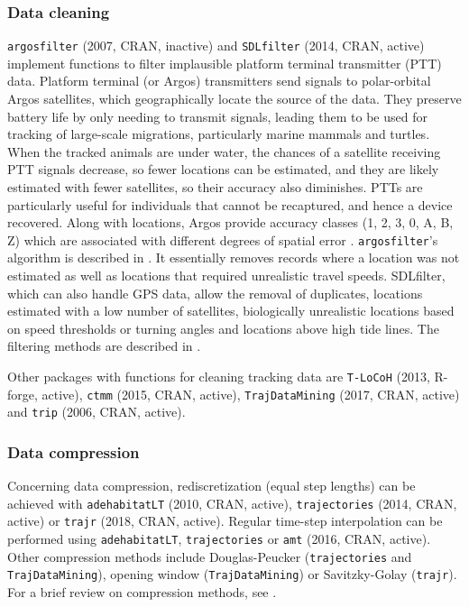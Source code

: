\documentclass[a4paper,12pt]{article}
\newcommand{\Rpkg}[1]{\texttt{#1}}
\begin{document}
\subsubsection*{Data cleaning}

\Rpkg{argosfilter} (2007, CRAN, inactive) and \Rpkg{SDLfilter} (2014, CRAN, active) implement functions to filter implausible platform terminal transmitter (PTT) data. Platform terminal (or Argos) transmitters send signals to polar-orbital Argos satellites, which geographically locate the source of the data. They preserve battery life by only needing to transmit signals, leading them to be used for tracking of large-scale migrations, particularly marine mammals and turtles. When the tracked animals are under water, the chances of a satellite receiving PTT signals decrease, so fewer locations can be estimated, and they are likely estimated with fewer satellites, so their accuracy also diminishes. PTTs are particularly useful for individuals that cannot be recaptured, and hence a device recovered. Along with locations, Argos provide accuracy classes (1, 2, 3, 0, A, B, Z) which are associated with different degrees of spatial error \citep{Costa2010}. \Rpkg{argosfilter}'s algorithm is described in \cite{Freitas2007}. It essentially removes records where a location was not estimated as well as locations that required unrealistic travel speeds. SDLfilter, which can also handle GPS data, allow the removal of duplicates, locations estimated with a low number of satellites, biologically unrealistic locations based on speed thresholds or turning angles and locations above high tide lines. The filtering methods are described in \cite{Shimada2012,Shimada2016}.

Other packages with functions for cleaning tracking data are \Rpkg{T-LoCoH} (2013, R-forge, active), \Rpkg{ctmm} (2015, CRAN, active), \Rpkg{TrajDataMining} (2017, CRAN, active) and \Rpkg{trip} (2006, CRAN, active). 

\subsubsection*{Data compression} %

Concerning data compression, rediscretization (equal step lengths) can be achieved with \Rpkg{adehabitatLT} (2010, CRAN, active), \Rpkg{trajectories} (2014, CRAN, active) or \Rpkg{trajr} (2018, CRAN, active). Regular time-step interpolation can be performed using \Rpkg{adehabitatLT}, \Rpkg{trajectories} or \Rpkg{amt} (2016, CRAN, active). Other compression methods include Douglas-Peucker (\Rpkg{trajectories} and \Rpkg{TrajDataMining}), opening window (\Rpkg{TrajDataMining}) or Savitzky-Golay (\Rpkg{trajr}). For a brief review on compression methods, see \cite{Meratnia2004}.
\end{document}
